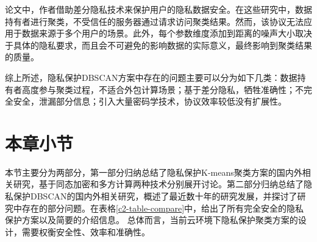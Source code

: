论文\cite{2018DP,2015A}中，作者借助差分隐私技术来保护用户的隐私数据安全。在这些研究中，数据持有者进行聚类，不受信任的服务器通过请求访问聚类结果。然而，该协议无法应用于数据来源于多个用户的场景。此外，每个参数维度添加到距离的噪声大小取决于具体的隐私要求，而且会不可避免的影响数据的实际意义，最终影响到聚类结果的质量。

综上所述，隐私保护DBSCAN方案中存在的问题主要可以分为如下几类：数据持有者高度参与聚类过程，不适合外包计算场景；基于差分隐私，牺牲准确性；不完全安全，泄漏部分信息；引入大量密码学技术，协议效率较低没有扩展性。

\section{本章小节}
本节主要分为两部分，第一部分归纳总结了隐私保护K-means聚类方案的国内外相关研究，基于同态加密和多方计算两种技术分别展开讨论。第二部分归纳总结了隐私保护DBSCAN的国内外相关研究，概述了最近数十年的研究发展，并探讨了研究中存在的部分问题。在表格\ref{c2-table-compare}中，给出了所有完全安全的隐私保护方案以及简要的介绍信息。
总体而言，当前云环境下隐私保护聚类方案的设计，需要权衡安全性、效率和准确性。

\begin{table}[htbp]
	\centering	
	\renewcommand{\arraystretch}{1.3}
	\caption{完全安全的隐私保护K-means和DBSCAN方案}
	\label{c2-table-compare}
\end{table}
